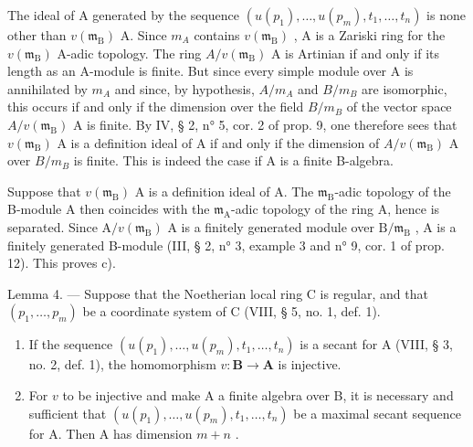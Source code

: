 The ideal of A generated by the sequence \((u(p_{1}), \ldots, u(p_{m}), t_{1}, \ldots, t_{n})\) is none other than \(v(\mathfrak{m}_{\mathrm{B}})\) A. Since \(m_{A}\) contains \(v(\mathfrak{m}_{\mathrm{B}})\) , A is a Zariski ring for the \(v(\mathfrak{m}_{\mathrm{B}})\) A-adic topology. The ring \(A/v(\mathfrak{m}_{\mathrm{B}})\) A is Artinian if and only if its length as an A-module is finite. But since every simple module over A is annihilated by \(m_{A}\) and since, by hypothesis, \(A/m_{A}\) and \(B/m_{B}\) are isomorphic, this occurs if and only if the dimension over the field \(B/m_{B}\) of the vector space \(A/v(\mathfrak{m}_{\mathrm{B}})\) A is finite. By IV, § 2, n° 5, cor. 2 of prop. 9, one therefore sees that \(v(\mathfrak{m}_{\mathrm{B}})\) A is a definition ideal of A if and only if the dimension of \(A/v(\mathfrak{m}_{\mathrm{B}})\) A over \(B/m_{B}\) is finite. This is indeed the case if A is a finite B-algebra.

Suppose that \(v(\mathfrak{m}_{\mathrm{B}})\) A is a definition ideal of A. The \(\mathfrak{m}_{\mathrm{B}}\)-adic topology of the B-module A then coincides with the \(\mathfrak{m}_{\mathrm{A}}\)-adic topology of the ring A, hence is separated. Since \(\mathrm{A} / v(\mathfrak{m}_{\mathrm{B}})\) A is a finitely generated module over \(\mathrm{B} / \mathfrak{m}_{\mathrm{B}}\) , A is a finitely generated B-module (III, § 2, n° 3, example 3 and n° 9, cor. 1 of prop. 12). This proves c).

Lemma 4. --- Suppose that the Noetherian local ring C is regular, and that \((p_1, \ldots, p_m)\) be a coordinate system of C (VIII, § 5, no. 1, def. 1).

\begin{enumerate}
\def\labelenumi{\alph{enumi})}
\item
  If the sequence \((u(p_1), \ldots, u(p_m), t_1, \ldots, t_n)\) is a secant for A (VIII, § 3, no. 2, def. 1), the homomorphism \(v: \mathbf{B} \to \mathbf{A}\) is injective.
\item
  For \(v\) to be injective and make A a finite algebra over B, it is necessary and sufficient that \((u(p_1), \ldots, u(p_m), t_1, \ldots, t_n)\) be a maximal secant sequence for A. Then A has dimension \(m + n\) .
\end{enumerate}

